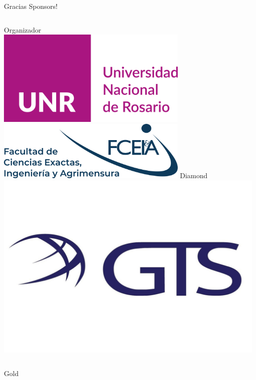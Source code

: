 \documentclass{beamer}
\begin{document}
\begin{frame}{Gracias Sponsors!}
    \begin{columns}[t]
        \centering
        Organizador\\
        \vspace{0.8cm}
        \includegraphics[width=0.7\textwidth,keepaspectratio]{logos/UNRlogo.png}
        \includegraphics[width=0.7\textwidth,keepaspectratio]{logos/FCEIA.png}
        \centering
        Diamond\\
        \includegraphics[width=1\textwidth,keepaspectratio]{logos/GTSlogo.jpeg}
    \end{columns}
    \begin{columns}[t]
        \centering
        Gold\\
        \begin{minipage}{0.5\textwidth}

\end{minipage}
\end{columns}
\end{frame}
\end{document}
